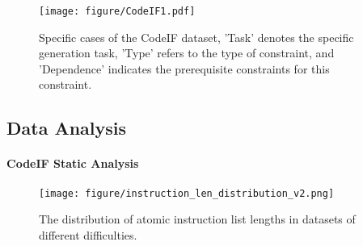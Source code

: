 \begin{figure}
    \centering
    \texttt{[image: figure/CodeIF1.pdf]}
    \caption{  Specific cases of the CodeIF dataset, 'Task' denotes the specific generation task, 'Type' refers to the type of constraint, and 'Dependence' indicates the prerequisite constraints for this constraint.}
    \label{fig:CodeIF_case}
\end{figure}

\subsection{Data Analysis}




\begin{table}[!t]
\centering
\scriptsize
\caption{CodeIF dataset statistics, showing the statistical information of different difficulty classifications. Avg.Instr represents the average length of the atomic constraint instruction list.}
\renewcommand{\arraystretch}{1} %
\label{tab:dataset_stats}
\end{table}



\paragraph{ CodeIF Static Analysis}
\begin{figure}
    \centering
    \texttt{[image: figure/instruction\_len\_distribution\_v2.png]}
    \caption{ The distribution of atomic instruction list lengths in datasets of different difficulties.}
    \label{fig:instruction_len_distribution_v2}
\end{figure}

